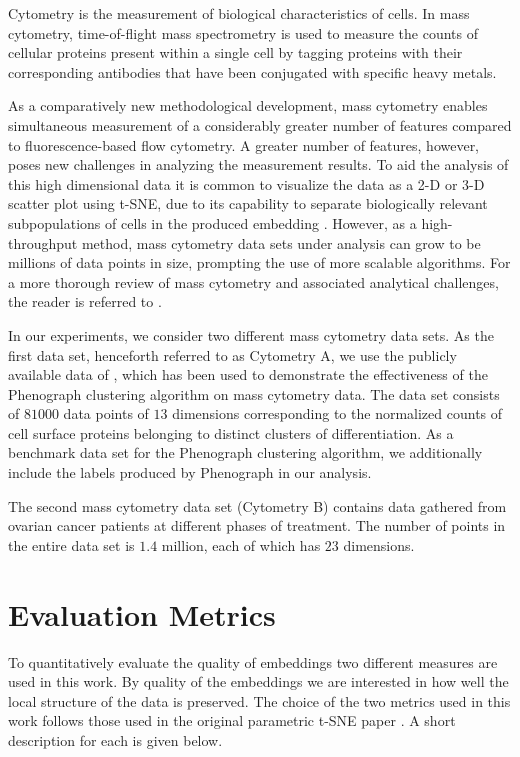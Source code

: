 Cytometry is the measurement of biological characteristics of cells. In mass cytometry, time-of-flight mass spectrometry is used to measure the counts of cellular proteins present within a single cell by tagging proteins with their corresponding antibodies that have been conjugated with specific heavy metals.

As a comparatively new methodological development, mass cytometry enables simultaneous measurement of a considerably greater number of features compared to fluorescence-based flow cytometry. A greater number of features, however, poses new challenges in analyzing the measurement results. To aid the analysis of this high dimensional data it is common to visualize the data as a 2-D or 3-D scatter plot using t-SNE, due to its capability to separate biologically relevant subpopulations of cells in the produced embedding \citep{visne}. However, as a high-throughput method, mass cytometry data sets under analysis can grow to be millions of data points in size, prompting the use of more scalable algorithms. For a more thorough review of mass cytometry and associated analytical challenges, the reader is referred to \cite{mass_cytometry}.

In our experiments, we consider two different mass cytometry data sets. As the first data set, henceforth referred to as Cytometry A, we use the publicly available data of \cite{phenograph}, which has been used to demonstrate the effectiveness of the Phenograph clustering algorithm on mass cytometry data. The data set consists of $81000$ data points of $13$ dimensions corresponding to the normalized counts of cell surface proteins belonging to distinct clusters of differentiation. As a benchmark data set for the Phenograph clustering algorithm, we additionally include the labels produced by Phenograph in our analysis.

The second mass cytometry data set (Cytometry B) contains data gathered from ovarian cancer patients at different phases of treatment. The number of points in the entire data set is $1.4$ million, each of which has $23$ dimensions.

\section{Evaluation Metrics}

To quantitatively evaluate the quality of embeddings two different measures are used in this work. By quality of the embeddings we are interested in how well the local structure of the data is preserved. The choice of the two metrics used in this work follows those used in the original parametric t-SNE paper \cite{parametric_tsne}. A short description for each is given below.

